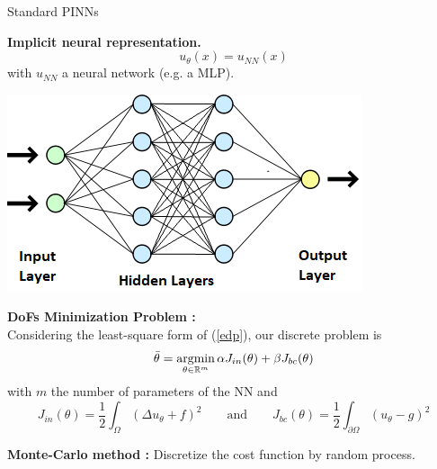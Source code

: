 \begin{frame}{Standard PINNs}
	\begin{minipage}{0.6\linewidth}
		\textbf{Implicit neural representation.}
		\begin{equation*}
			u_\theta(x)=u_{NN}(x)
		\end{equation*}
		with $u_{NN}$ a neural network (e.g. a MLP).
	\end{minipage}
	\begin{minipage}{0.36\linewidth}
		\includegraphics[width=0.95\linewidth]{images/learn_levelset/MLP_schema.png}
	\end{minipage}
	
	\vspace{5pt}
	
	\textbf{DoFs Minimization Problem :} \footnotesize\citep{raissi_physics-informed_2019}\normalsize \\
	Considering the least-square form of (\ref{edp}), our discrete problem is
	\begin{equation*}
		\displaystyle \bar{\theta}=\argmin_{\theta\in\mathbb{R}^m} \alpha J_{in}(\theta)+\beta J_{bc}(\theta) %
	\end{equation*}
	with $m$ the number of parameters of the NN and
	\begin{equation*}
		J_{in}(\theta)=\frac{1}{2}\int_\Omega (\Delta u_\theta + f)^2  \qquad \text{and} \qquad J_{bc}(\theta)=\frac{1}{2}\int_{\partial\Omega} (u_\theta-g)^2
	\end{equation*}	
	
	\textbf{Monte-Carlo method :} Discretize the cost function by random process.
\end{frame}

